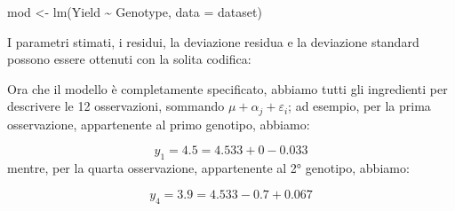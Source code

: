\documentclass[
  12pt,
]{book}
\newenvironment{Shaded}{\begin{snugshade}}{\end{snugshade}}
\newcommand{\AttributeTok}[1]{\textcolor[rgb]{0.77,0.63,0.00}{#1}}
\newcommand{\CommentTok}[1]{\textcolor[rgb]{0.56,0.35,0.01}{\textit{#1}}}
\newcommand{\DocumentationTok}[1]{\textcolor[rgb]{0.56,0.35,0.01}{\textbf{\textit{#1}}}}
\newcommand{\FunctionTok}[1]{\textcolor[rgb]{0.00,0.00,0.00}{#1}}
\newcommand{\NormalTok}[1]{#1}
\newcommand{\OtherTok}[1]{\textcolor[rgb]{0.56,0.35,0.01}{#1}}
\newcommand{\SpecialCharTok}[1]{\textcolor[rgb]{0.00,0.00,0.00}{#1}}
\begin{document}
\vspace{12pt}

\begin{Shaded}
\begin{Highlighting}[]
\NormalTok{mod }\OtherTok{\textless{}{-}} \FunctionTok{lm}\NormalTok{(Yield }\SpecialCharTok{\textasciitilde{}}\NormalTok{ Genotype, }\AttributeTok{data =}\NormalTok{ dataset)}
\end{Highlighting}
\end{Shaded}

I parametri stimati, i residui, la deviazione residua e la deviazione standard possono essere ottenuti con la solita codifica:

\vspace{12pt}

\begin{Shaded}
\end{Shaded}

Ora che il modello è completamente specificato, abbiamo tutti gli ingredienti per descrivere le 12 osservazioni, sommando \(\mu + \alpha_j + \varepsilon_i\); ad esempio, per la prima osservazione, appartenente al primo genotipo, abbiamo:

\[y_1 = 4.5 = 4.533 + 0 - 0.033\]
mentre, per la quarta osservazione, appartenente al 2° genotipo, abbiamo:

\[y_4 = 3.9 = 4.533 - 0.7 + 0.067\]
\end{document}
